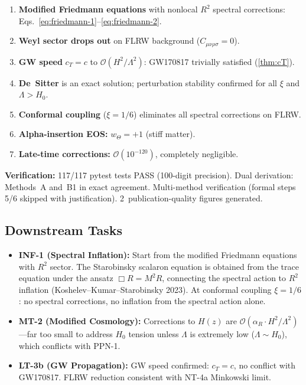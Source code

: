 \documentclass[11pt,a4paper]{article}
\theoremstyle{plain}
\theoremstyle{definition}
\begin{document}
\begin{tcolorbox}[colback=blue!5!white, colframe=blue!50!black,
  title={\textbf{NT-4c Main Results}}]
\begin{enumerate}[nosep]
  \item \textbf{Modified Friedmann equations} with nonlocal $R^2$
    spectral corrections: Eqs.~\eqref{eq:friedmann-1}--\eqref{eq:friedmann-2}.
  \item \textbf{Weyl sector drops out} on FLRW background
    ($C_{\mu\nu\rho\sigma} = 0$).
  \item \textbf{GW speed} $c_T = c$ to $\mathcal{O}(H^2/\Lambda^2)$:
    GW170817 trivially satisfied (\cref{thm:cT}).
  \item \textbf{De~Sitter} is an exact solution; perturbation
    stability confirmed for all $\xi$ and $\Lambda > H_0$.
  \item \textbf{Conformal coupling} ($\xi = 1/6$) eliminates all
    spectral corrections on FLRW.
  \item \textbf{Alpha-insertion EOS:} $w_\Theta = +1$ (stiff matter).
  \item \textbf{Late-time corrections:}
    $\mathcal{O}(10^{-120})$, completely negligible.
\end{enumerate}

\medskip
\noindent\textbf{Verification:}
117/117 pytest tests PASS (100-digit precision).
Dual derivation: Methods~A and~B1 in exact agreement.
Multi-method verification (formal steps 5/6 skipped with justification).
2~publication-quality figures generated.
\end{tcolorbox}

\subsection{Downstream Tasks}

\begin{itemize}[nosep]
  \item \textbf{INF-1 (Spectral Inflation):} Start from the modified
    Friedmann equations with $R^2$ sector. The Starobinsky scalaron
    equation is obtained from the trace equation under the ansatz
    $\Box R = M^2 R$, connecting the spectral action to
    $R^2$ inflation (Koshelev--Kumar--Starobinsky 2023).
    At conformal coupling $\xi = 1/6$: no spectral corrections,
    no inflation from the spectral action alone.
  \item \textbf{MT-2 (Modified Cosmology):} Corrections to $H(z)$
    are $\mathcal{O}(\alpha_R\cdot H^2/\Lambda^2)$---far too small
    to address $H_0$ tension unless $\Lambda$ is extremely low
    ($\Lambda \sim H_0$), which conflicts with PPN-1.
  \item \textbf{LT-3b (GW Propagation):} GW speed confirmed:
    $c_T = c$, no conflict with GW170817. FLRW reduction
    consistent with NT-4a Minkowski limit.
\end{itemize}
\end{document}
